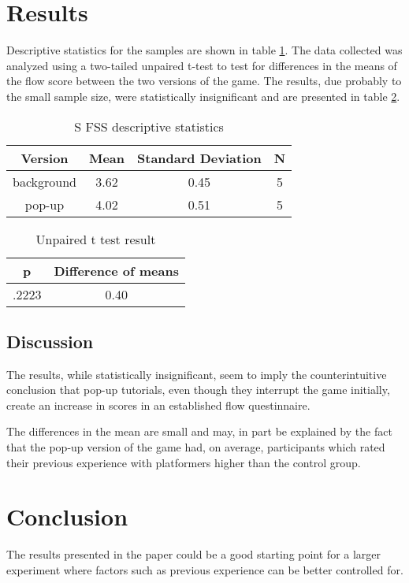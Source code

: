 \documentclass{acmsiggraph}
\begin{document}
\section{Results}

Descriptive statistics for the samples are shown in table \ref{SFSS descriptive}. The data collected was analyzed using a two-tailed unpaired t-test to test for differences in the means of the flow score between the two versions of the game. The results, due probably to the small sample size, were statistically insignificant and are presented in table \ref{ttest}.

\begin{table}[ht]
  \centering
  \caption{S FSS descriptive statistics}
  \label{SFSS descriptive}
  \begin{tabular}{|c|c|c|c|}
  	\hline
  	\textbf{Version} & \textbf{Mean} & \textbf{Standard Deviation} & \textbf{N}\\
    \hline
    background & 3.62 & 0.45 & 5 \\
	pop-up & 4.02 & 0.51 & 5 \\
    \hline
  \end{tabular}
\end{table}

\begin{table}[ht]
  \centering
  \caption{Unpaired t test result}
  \label{ttest}
  \begin{tabular}{|c|c|}
  	\hline
  	\textbf{p} & \textbf{Difference of means}\\
    \hline
    .2223 & 0.40 \\
    \hline
  \end{tabular}
\end{table}

\subsection{Discussion}
The results, while statistically insignificant, seem to imply the counterintuitive conclusion that pop-up tutorials, even though they interrupt the game initially, create an increase in scores in an established flow questinnaire.

The differences in the mean are small and may, in part be explained by the fact that the pop-up version of the game had, on average, participants which rated their previous experience with platformers higher than the control group. 

\section{Conclusion}
The results presented in the paper could be a good starting point for a larger experiment where factors such as previous experience can be better controlled for.
\end{document}
